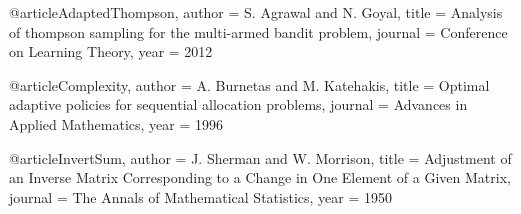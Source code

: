 @article{AdaptedThompson,
 author = {S. Agrawal and N. Goyal},
 title = {Analysis of thompson sampling for the multi-armed bandit problem},
 journal = {Conference on Learning Theory},
 year = 2012
}

@article{Complexity,
 author = {A. Burnetas and M. Katehakis},
 title = {Optimal adaptive policies for sequential allocation problems},
 journal = {Advances in Applied Mathematics},
 year = 1996
}

@article{InvertSum,
 author = {J. Sherman and W. Morrison},
 title = {Adjustment of an Inverse Matrix Corresponding to a Change in One Element of a Given Matrix},
 journal = {The Annals of Mathematical Statistics},
 year = 1950
}

